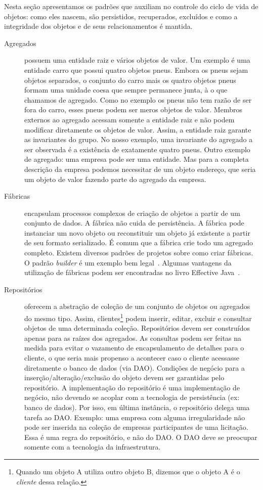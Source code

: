 \documentclass[a4paper, 12pt]{article}
\begin{document}
Nesta seção apresentamos os padrões que auxiliam no controle do ciclo de vida de objetos: como eles nascem, são persistidos, recuperados, excluídos e como a integridade dos objetos e de seus relacionamentos é mantida.


\begin{description}

\item [Agregados] possuem uma entidade raiz e vários objetos de valor. Um exemplo é uma entidade carro que possui quatro objetos pneus. Embora os pneus sejam objetos separados, o conjunto do carro mais os quatro objetos pneus formam uma unidade coesa que sempre permanece junta, à o que chamamos de agregado. Como no exemplo os pneus não tem razão de ser fora do carro, esses pneus podem ser meros objetos de valor. Membros externos ao agregado acessam somente a entidade raiz e não podem modificar diretamente os objetos de valor. Assim, a entidade raiz garante as invariantes do grupo. No nosso exemplo, uma invariante do agregado a ser observada é a existência de exatamente quatro pneus. Outro exemplo de agregado: uma empresa pode ser uma entidade. Mas para a completa descrição da empresa podemos necessitar de um objeto endereço, que seria um objeto de valor fazendo parte do agregado da empresa.

\item [Fábricas] encapsulam processos complexos de criação de objetos a partir de um conjunto de dados. A fábrica não cuida de persistência. A fábrica pode instanciar um novo objeto ou reconstituir um objeto já existente a partir de seu formato serializado. É comum que a fábrica crie todo um agregado completo.
Existem diversos padrões de projetos sobre como criar fábricas. O padrão \emph{builder} é um exemplo bem legal~\cite{Guerra2013Builder}. Algumas vantagens da utilização de fábricas podem ser encontradas no livro Effective Java~\cite{Bloch2008Factory}. 

\item [Repositórios] oferecem a abstração de coleção de um conjunto de objetos ou agregados do mesmo tipo. Assim, clientes\footnote{Quando um objeto A utiliza outro objeto B, dizemos que o objeto A é o \emph{cliente} dessa relação.} podem inserir, editar, excluir e consultar objetos de uma determinada coleção. Repositórios devem ser construídos apenas para as raízes dos agregados. As consultas podem ser feitas na medida para evitar o vazamento de encapsulamento de detalhes para o cliente, o que seria mais propenso a acontecer caso o cliente acessasse diretamente o banco de dados (via DAO). Condições de negócio para a inserção/alteração/exclusão do objeto devem ser garantidas pelo repositório. A implementação do repositório é uma implementação de negócio, não devendo se acoplar com a tecnologia de persistência (ex: banco de dados). Por isso, em última instância, o repositório delega uma tarefa ao DAO. Exemplo: uma empresa com alguma irregularidade não pode ser inserida na coleção de empresas participantes de uma licitação. Essa é uma regra do repositório, e não do DAO. O DAO deve se preocupar somente com a tecnologia da infraestrutura.

\end{description}
\end{document}
